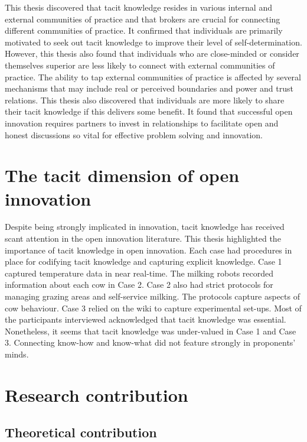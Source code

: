 This thesis discovered that tacit knowledge resides in various internal and external communities of practice and that brokers are crucial for connecting different communities of practice. It confirmed that individuals are primarily motivated to seek out tacit knowledge to improve their level of self-determination. However, this thesis also found that individuals who are close-minded or consider themselves superior are less likely to connect with external communities of practice. The ability to tap external communities of practice is affected by several mechanisms that may include real or perceived boundaries and power and trust relations. This thesis also discovered that individuals are more likely to share their tacit knowledge if this delivers some benefit. It found that successful open innovation requires partners to invest in relationships to facilitate open and honest discussions so vital for effective problem solving and innovation.

\section{The tacit dimension of open innovation}

Despite being strongly implicated in innovation, tacit knowledge has received scant attention in the open innovation literature. This thesis highlighted the importance of tacit knowledge in open innovation. Each case had procedures in place for codifying tacit knowledge and capturing explicit knowledge. Case 1 captured temperature data in near real-time. The milking robots recorded information about each cow in Case 2. Case 2 also had strict protocols for managing grazing areas and self-service milking. The protocols capture aspects of cow behaviour. Case 3 relied on the wiki to capture experimental set-ups. Most of the participants interviewed acknowledged that tacit knowledge was essential. Nonetheless, it seems that tacit knowledge was under-valued in Case 1 and Case 3. Connecting know-how and know-what did not feature strongly in proponents' minds. 

\section{Research contribution}

\subsection{Theoretical contribution}

